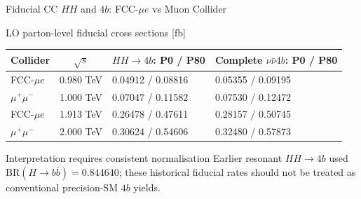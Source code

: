\documentclass[aspectratio=1610,english]{beamer}
\newcommand{\src}[1]{\vfill{\par\color{black!65}\fontsize{6.4}{7.4}\selectfont\emph{Source:} #1\par}}
\begin{document}
\begin{frame}[t]{Fiducial CC $HH$ and $4b$: FCC-$\mu e$ vs Muon Collider}
\small

\begin{block}{LO parton-level fiducial cross sections [fb]}
\begin{center}\scriptsize\setlength{\tabcolsep}{5pt}\renewcommand{\arraystretch}{1.35}
\begin{tabular}{lcll}\toprule
Collider & $\sqrt{s}$ & $HH\to4b$: P0 / P80 & Complete $\nu\bar\nu4b$: P0 / P80\\\midrule
FCC-$\mu e$ & 0.980 TeV & 0.04912 / 0.08816 & 0.05355 / 0.09195\\
$\mu^+\mu^-$ & 1.000 TeV & 0.07047 / 0.11582 & 0.07530 / 0.12472\\
FCC-$\mu e$ & 1.913 TeV & 0.26478 / 0.47611 & 0.28157 / 0.50745\\
$\mu^+\mu^-$ & 2.000 TeV & 0.30624 / 0.54606 & 0.32480 / 0.57873\\\bottomrule
\end{tabular}\end{center}
\end{block}

\begin{alertblock}{Interpretation requires consistent normalisation}
Earlier resonant $HH\to4b$ used $\mathrm{BR}(H\to b\bar b)=0.844640$; these historical fiducial rates should not be treated as conventional precision-SM $4b$ yields.
\end{alertblock}

\end{frame}
\end{document}
